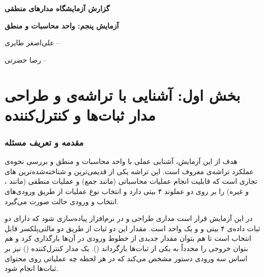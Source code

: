 \documentclass[12pt,a4paper]{article}
\title{}
\author{}
\date{}
\begin{document}
\begin{titlepage}
\begin{center}
\vspace*{2cm}

\vspace{2cm}

{\huge \textbf{گزارش آزمایشگاه مدارهای منطقی}}

\vspace{0.6cm}

{\LARGE \textbf{آزمایش پنجم: واحد محاسبات و منطق}\ }

\vspace{2.2cm}

{\Large علی‌اصغر طایری -- }

\vspace{0.3cm}

{\Large رضا حضرتی -- }

\vfill

\end{center}
\end{titlepage}

\tableofcontents
\newpage

\part{بخش اول: آشنایی با تراشه‌ی  و طراحی مدار ثبات‌ها و کنترل‌کننده}

\section{مقدمه و تعریف مسئله}

هدف از این آزمایش، آشنایی عملی با واحد محاسبات و منطق  و بررسی نحوه‌ی عملکرد تراشه‌ی معروف  است. این تراشه یکی از قدیمی‌ترین و شناخته‌شده‌ترین های تجاری است که قابلیت انجام عملیات محاسباتی (مانند جمع) و عملیات منطقی (مانند ،  و غیره) را بر روی دو عملوند ۴ بیتی دارد و انتخاب نوع عملیات از طریق ورودی‌های انتخاب  و ورودی حالت  صورت می‌گیرد.

در این آزمایش قرار است مداری طراحی و در نرم‌افزار  پیاده‌سازی شود که دارای دو ثبات داده‌ی ۴ بیتی  و  و یک واحد  است. مقدار این دو ثبات از طریق دو مالتی‌پلکسر قابل انتخاب است تا هم بتوان مقدار جدیدی از خطوط ورودی  در آن‌ها بارگذاری کرد و هم بتوان خروجی  را مجدداً به یکی از ثبات‌ها بازگرداند (). یک مدار کنترل‌کننده () نیز بر اساس سه ورودی دستور  مشخص می‌کند که در هر لحظه چه عملیاتی روی محتوای ثبات‌ها انجام شود.
\end{document}

